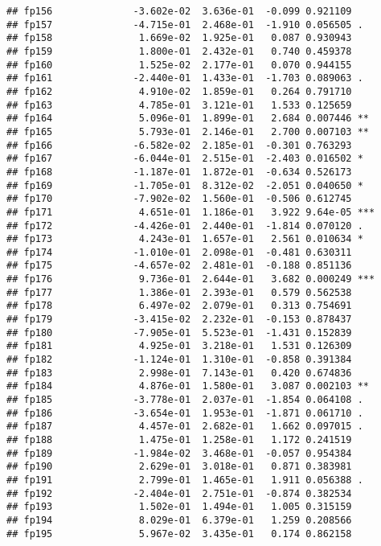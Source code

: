 \documentclass[
]{article}
\begin{document}
\begin{verbatim}
## fp156              -3.602e-02  3.636e-01  -0.099 0.921109    
## fp157              -4.715e-01  2.468e-01  -1.910 0.056505 .  
## fp158               1.669e-02  1.925e-01   0.087 0.930943    
## fp159               1.800e-01  2.432e-01   0.740 0.459378    
## fp160               1.525e-02  2.177e-01   0.070 0.944155    
## fp161              -2.440e-01  1.433e-01  -1.703 0.089063 .  
## fp162               4.910e-02  1.859e-01   0.264 0.791710    
## fp163               4.785e-01  3.121e-01   1.533 0.125659    
## fp164               5.096e-01  1.899e-01   2.684 0.007446 ** 
## fp165               5.793e-01  2.146e-01   2.700 0.007103 ** 
## fp166              -6.582e-02  2.185e-01  -0.301 0.763293    
## fp167              -6.044e-01  2.515e-01  -2.403 0.016502 *  
## fp168              -1.187e-01  1.872e-01  -0.634 0.526173    
## fp169              -1.705e-01  8.312e-02  -2.051 0.040650 *  
## fp170              -7.902e-02  1.560e-01  -0.506 0.612745    
## fp171               4.651e-01  1.186e-01   3.922 9.64e-05 ***
## fp172              -4.426e-01  2.440e-01  -1.814 0.070120 .  
## fp173               4.243e-01  1.657e-01   2.561 0.010634 *  
## fp174              -1.010e-01  2.098e-01  -0.481 0.630311    
## fp175              -4.657e-02  2.481e-01  -0.188 0.851136    
## fp176               9.736e-01  2.644e-01   3.682 0.000249 ***
## fp177               1.386e-01  2.393e-01   0.579 0.562538    
## fp178               6.497e-02  2.079e-01   0.313 0.754691    
## fp179              -3.415e-02  2.232e-01  -0.153 0.878437    
## fp180              -7.905e-01  5.523e-01  -1.431 0.152839    
## fp181               4.925e-01  3.218e-01   1.531 0.126309    
## fp182              -1.124e-01  1.310e-01  -0.858 0.391384    
## fp183               2.998e-01  7.143e-01   0.420 0.674836    
## fp184               4.876e-01  1.580e-01   3.087 0.002103 ** 
## fp185              -3.778e-01  2.037e-01  -1.854 0.064108 .  
## fp186              -3.654e-01  1.953e-01  -1.871 0.061710 .  
## fp187               4.457e-01  2.682e-01   1.662 0.097015 .  
## fp188               1.475e-01  1.258e-01   1.172 0.241519    
## fp189              -1.984e-02  3.468e-01  -0.057 0.954384    
## fp190               2.629e-01  3.018e-01   0.871 0.383981    
## fp191               2.799e-01  1.465e-01   1.911 0.056388 .  
## fp192              -2.404e-01  2.751e-01  -0.874 0.382534    
## fp193               1.502e-01  1.494e-01   1.005 0.315159    
## fp194               8.029e-01  6.379e-01   1.259 0.208566    
## fp195               5.967e-02  3.435e-01   0.174 0.862158    

\end{verbatim}
\end{document}
